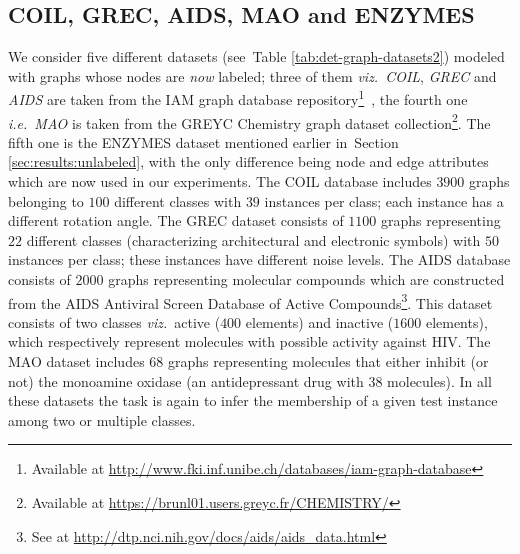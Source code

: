 \documentclass[journal]{IEEEtran}
\theoremstyle{definition}
\newcommand{\ie}{\textit{i.e.}}
\newcommand{\viz}{\textit{viz.}}
\newcommand{\sect}[1]{Section \ref{#1}}
\newcommand{\tab}[1]{Table \ref{#1}}
\begin{document}
\subsection{COIL, GREC, AIDS, MAO and ENZYMES}\label{sec:withlabels}
We consider five different datasets (see~\tab{tab:det-graph-datasets2}) modeled with graphs whose nodes are {\it now} labeled; three of them \viz~\emph{COIL}, \emph{GREC} and \emph{AIDS} are taken from the IAM graph database repository\footnote{Available at \url{http://www.fki.inf.unibe.ch/databases/iam-graph-database}}~\cite{Riesen2008}, the fourth one \ie~\emph{MAO} is taken from the GREYC Chemistry graph dataset collection\footnote{Available at \url{https://brunl01.users.greyc.fr/CHEMISTRY/}}. The fifth one is the ENZYMES dataset mentioned earlier in~\sect{sec:results:unlabeled}, with the only difference being node and edge attributes which are now used in our experiments. The COIL database includes $3900$ graphs belonging to $100$ different classes with $39$ instances per class; each instance has a different rotation angle. The GREC dataset consists of $1100$ graphs representing $22$ different classes (characterizing architectural and electronic symbols) with $50$ instances per class; these instances have different noise levels. The AIDS database consists of $2000$ graphs representing molecular compounds which are constructed from the AIDS Antiviral Screen Database of Active Compounds\footnote{See at \url{http://dtp.nci.nih.gov/docs/aids/aids_data.html}}. This dataset consists of two classes \viz~active ($400$ elements) and inactive ($1600$ elements), which respectively represent molecules with possible activity against HIV. The MAO dataset includes $68$ graphs representing molecules that either inhibit (or not) the monoamine oxidase (an antidepressant drug with $38$ molecules). In all these datasets the task is again to infer the membership of a given test instance among two or multiple classes. 

\begin{table}[!htbp]
\begin{center}
\caption{Available details on COIL, GREC, AIDS, MAO and ENZYMES (labeled) graph datasets.}
\label{tab:det-graph-datasets2}
\end{center}
\end{table}
\end{document}
